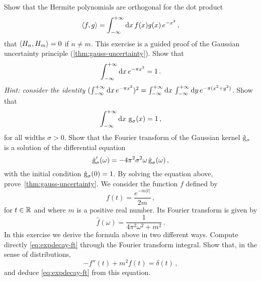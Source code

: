 \begin{ExerciseList}
  \Question Show that the Hermite polynomials are orthogonal for the dot product
  \begin{equation}
    \braket{f,g}=\int_{-\infty}^{+\infty}\mathrm{d}{x}\,f(x)g(x)\,e^{-x^2}\,,
  \end{equation}
  \ie that $\braket{H_n,H_m}=0$ if $n\neq m$.
  \Exercise[label=gauss-uncertainty]
  This exercise is a guided proof of the
  Gaussian uncertainty principle (\cref{thm:gauss-uncertainty}).
  \Question Show that
  \begin{equation}
    \int_{-\infty}^{+\infty}\mathrm{d}{x}\,e^{-\pi x^2}=1\,.
  \end{equation}
  \emph{Hint: consider the identity }
  $(\int_{-\infty}^{+\infty}\mathrm{d}{x}\,e^{-\pi x^2})^2=\int_{-\infty}^{+\infty}\mathrm{d}{x}\,\int_{-\infty}^{+\infty}\mathrm{d}{y}\,e^{-\pi (x^2+y^2)}$.
  \Question Show that
  \begin{equation}
    \int_{-\infty}^{+\infty}\mathrm{d}{x}\,\operatorname{g}_{\sigma}(x)=1\,,
  \end{equation}
  for all widths $\sigma>0$.
  \Question Show that the Fourier transform of the Gaussian kernel $\hat{\operatorname{g}}_{\sigma}$
  is a solution of the differential equation
  \begin{equation}
    \hat{\operatorname{g}}_{\sigma}'(\omega)=-4\pi^2\sigma^2\omega\,\hat{\operatorname{g}}_{\sigma}(\omega)\,,
  \end{equation}
  with the initial condition $\hat{\operatorname{g}}_{\sigma}(0)=1$.
  \Question By solving the equation above, prove~\cref{thm:gauss-uncertainty}.
  \Exercise[label=exp-decay]
  We consider the function $f$ defined by
  \begin{equation}
    f(t)=\frac{e^{-m|t|}}{2m}\,,
  \end{equation}
  for $t\in\mathbb{R}$ and where $m$ is a positive real number. Its Fourier transform is given by
  \begin{equation}
    \hat{f}(\omega)=\frac{1}{4\pi^2\omega^2+m^2}\,.
    \label{eq:expdecay-ft}
  \end{equation}
  In this exercise we derive the formula above in two different ways.
  \Question Compute directly \cref{eq:expdecay-ft} through the Fourier transform integral.
  \Question Show that, in the sense of distributions,
  \begin{equation}
    -f''(t)+m^2f(t)=\delta(t)\,,
  \end{equation}
  and deduce \cref{eq:expdecay-ft} from this equation.
\end{ExerciseList}